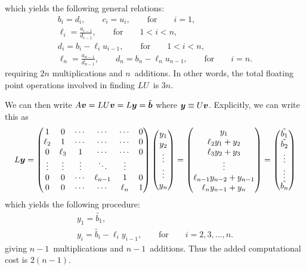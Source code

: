 \documentclass[english,notitlepage]{revtex4-1}  %
\begin{document}
which yields the following general relations: 
\begin{gather}
	b_i = d_i, \qquad c_i = u_i, \qquad \text{for} \qquad i = 1,\\
	\ell_i = \frac{a_{i-1}}{d_{i-1}}, \qquad \text{for} \qquad 1 < i < n, \\
	d_i = b_i - \ell_iu_{i-1}, \qquad \text{for} \qquad 1 < i < n, \\
	\ell_n = \frac{a_{n-1}}{d_{n-1}}, \qquad d_n = b_n - \ell_n u_{n-1}, \qquad \text{for} \qquad i = n.
\end{gather}
requiring $2n$ multiplications and $n$ additions. In other words, the total floating point operations involved in finding $LU$ is $3n$.

We can then write $A\vb*{v} = LU\vb*{v} = L\vb*{y} =  \tilde{\vb*{b}}$ where $\vb*{y} \equiv U\vb*{v}$. Explicitly, we can write this as 
\begin{equation}
	L\vb*{y} = 	\begin{pmatrix}
	1 & 0 & \cdots &  \cdots & \cdots & 0 \\
	\ell_2 & 1 & \cdots & \cdots & \cdots & 0 \\
	0 & \ell_3 & 1 & \cdots & \cdots & 0 \\
	\vdots & \vdots & \vdots & \ddots & \vdots \\
	0 & 0 & \cdots & \ell_{n-1} & 1 & 0 \\
	0 & 0 & \cdots &\cdots & \ell_n & 1  
	\end{pmatrix}
	\begin{pmatrix}
	y_1 \\ y_2 \\ \vdots \\ \vdots \\ y_n 
	\end{pmatrix}
	=
	\begin{pmatrix}
	y_1 \\
	\ell_2y_1 + y_2 \\
	\ell_3y_2 + y_3 \\
	\vdots \\
	\ell_{n-1}y_{n-2} + y_{n-1} \\ 
	\ell_ny_{n-1} + y_{n}
	\end{pmatrix}
	=
	\begin{pmatrix}
	\tilde{b_1} \\ \tilde{b_2} \\ \vdots \\ \vdots \\ \tilde{b_n}
	\end{pmatrix}
\end{equation}
which yields the following procedure:
\begin{gather}
	y_1 = \tilde{b_1}, \\
	y_i = \tilde{b_i} - \ell_iy_{i-1}, \qquad \text{for} \qquad i =2,3,...,n.
\end{gather}
giving $n-1$ multiplications and $n-1$ additions. Thus the added computational cost is $2(n-1)$. 
\end{document}
